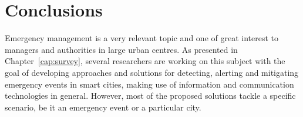 \chapter{Conclusions}\label{cap:conclusao}


Emergency management is a very relevant topic and one of great interest to managers and authorities in large urban centres. As presented in Chapter~\ref{cap:survey}, several researchers are working on this subject with the goal of developing approaches and solutions for detecting, alerting and mitigating emergency events in smart cities, making use of information and communication technologies in general. However, most of the proposed solutions tackle a specific scenario, be it an emergency event or a particular city.


